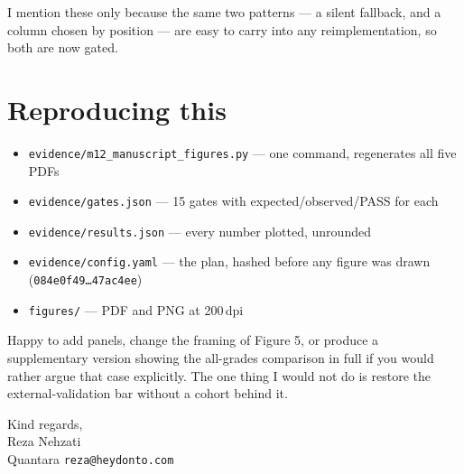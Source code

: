 \documentclass[11pt,a4paper]{article}
\begin{document}
I mention these only because the same two patterns --- a silent fallback, and a column chosen by
position --- are easy to carry into any reimplementation, so both are now gated.

\section{Reproducing this}

\begin{itemize}[leftmargin=1.2em,itemsep=1pt]
\item \texttt{evidence/m12\_manuscript\_figures.py} --- one command, regenerates all five PDFs
\item \texttt{evidence/gates.json} --- 15 gates with expected/observed/PASS for each
\item \texttt{evidence/results.json} --- every number plotted, unrounded
\item \texttt{evidence/config.yaml} --- the plan, hashed before any figure was drawn
      (\texttt{084e0f49\ldots47ac4ee})
\item \texttt{figures/} --- PDF and PNG at 200\,dpi
\end{itemize}

\medskip
\noindent Happy to add panels, change the framing of Figure 5, or produce a supplementary
version showing the all-grades comparison in full if you would rather argue that case
explicitly. The one thing I would not do is restore the external-validation bar without a cohort
behind it.

\medskip
\noindent Kind regards,\\[10pt]
Reza Nehzati\\
Quantara \quad\textbullet\quad \texttt{reza@heydonto.com}
\end{document}
